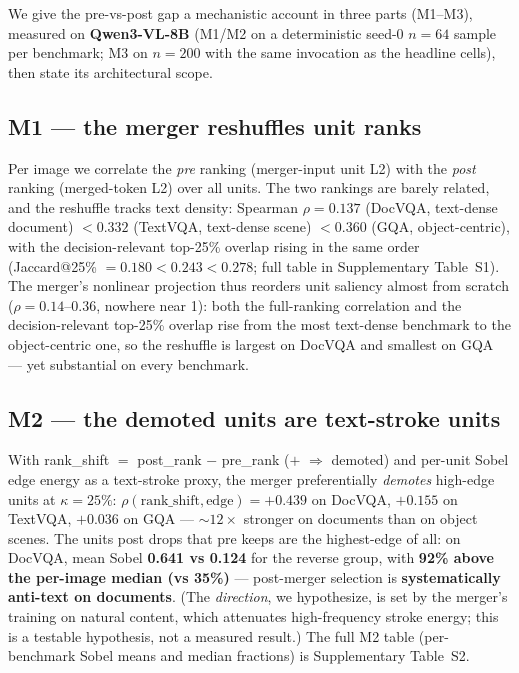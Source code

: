 \documentclass[sigconf,review,anonymous]{acmart}
\begin{document}
We give the pre-vs-post gap a mechanistic account in three parts (M1--M3),
measured on \textbf{Qwen3-VL-8B} (M1/M2 on a deterministic seed-0 $n = 64$ sample
per benchmark; M3 on $n = 200$ with the same invocation as the headline cells),
then state its architectural scope.

\subsection{M1 --- the merger reshuffles unit ranks}\label{sec:m1}

Per image we correlate the \emph{pre} ranking (merger-input unit L2) with the
\emph{post} ranking (merged-token L2) over all units. The two rankings are
barely related, and the reshuffle tracks text density: Spearman
$\rho = \mathbf{0.137}$ (DocVQA, text-dense document) $< 0.332$ (TextVQA,
text-dense scene) $< \mathbf{0.360}$ (GQA, object-centric), with the
decision-relevant top-25\% overlap rising in the same order (Jaccard@25\%
$= 0.180 < 0.243 < 0.278$; full table in Supplementary Table~S1). The merger's
nonlinear projection thus reorders unit saliency almost from scratch
($\rho = 0.14$--$0.36$, nowhere near 1): both the full-ranking correlation and
the decision-relevant top-25\% overlap rise from the most text-dense benchmark
to the object-centric one, so the reshuffle is largest on DocVQA and smallest on
GQA --- yet substantial on every benchmark.

\subsection{M2 --- the demoted units are text-stroke units}\label{sec:m2}

With rank\_shift $=$ post\_rank $-$ pre\_rank ($+$ $\Rightarrow$ demoted) and
per-unit Sobel edge energy as a text-stroke proxy, the merger preferentially
\emph{demotes} high-edge units at $\kappa = 25\%$: $\rho(\text{rank\_shift},
\text{edge}) = +0.439$ on DocVQA, $+0.155$ on TextVQA, $+0.036$ on GQA ---
${\sim}12\times$ stronger on documents than on object scenes. The units post
drops that pre keeps are the highest-edge of all: on DocVQA, mean Sobel
\textbf{0.641 vs 0.124} for the reverse group, with \textbf{92\% above the
per-image median (vs 35\%)} --- post-merger selection is \textbf{systematically
anti-text on documents}. (The \emph{direction}, we hypothesize, is set by the
merger's training on natural content, which attenuates high-frequency stroke
energy; this is a testable hypothesis, not a measured result.) The full M2 table
(per-benchmark Sobel means and median fractions) is Supplementary Table~S2.
\end{document}
